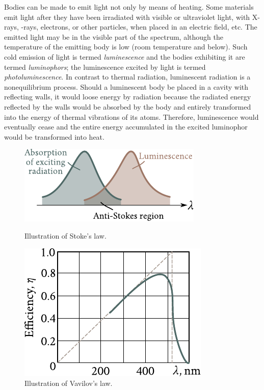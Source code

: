 Bodies can be made to emit light not only by means of heating. Some materials emit light after they have been irradiated with visible or ultraviolet light, with X-rays, \ce{\gamma}-rays, electrons, or other particles, when placed in an electric field, etc. The emitted light may be in the visible part of the spectrum, although the temperature of the emitting body is low (room temperature and below). Such cold emission of light is termed \textit{luminescence} and the bodies exhibiting it
are termed \textit{luminophors}; the luminescence excited by light is termed \textit{photoluminescence}. In contrast to thermal radiation, luminescent radiation is a nonequilibrium process. Should a luminescent body be placed in a cavity with reflecting walls, it would loose energy by radiation because the radiated energy reflected by the walls would be absorbed by the body and entirely transformed into the energy of thermal vibrations of its atoms. Therefore, luminescence would eventually cease and the entire energy accumulated in the excited luminophor would be transformed into heat.

\begin{figure}[!t]
	\begin{minipage}[t]{0.48\linewidth}
		\begin{center}
			\includegraphics[scale=1]{figures/ch_06/fig_6_22.pdf}
			\caption[]{Illustration of Stoke's law.}
			\label{fig:6_22}
		\end{center}
	\end{minipage}
	\hfill{ }%
	\begin{minipage}[t]{0.48\linewidth}
		\begin{center}
			\includegraphics[scale=0.9]{figures/ch_06/fig_6_23.pdf}
			\caption[]{Illustration of Vavilov's law.}
			\label{fig:6_23}
		\end{center}
	\end{minipage}
\vspace{-0.3cm}
\end{figure}


